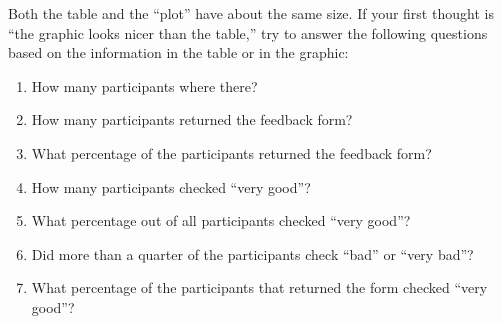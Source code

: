\bigskip
\par
{}
\bigskip

Both the table and the ``plot'' have about the same size. If your first
thought is ``the graphic looks nicer than the table,'' try to answer
the following questions based on the information in the table or in
the graphic:
\begin{enumerate}
\item
  How many participants where there?
\item
  How many participants returned the feedback form?
\item
  What percentage of the participants returned the feedback form?
\item
  How many participants checked ``very good''?
\item
  What percentage out of all participants checked ``very good''?
\item
  Did more than a quarter of the participants check ``bad'' or ``very bad''?
\item
  What percentage of the participants that returned the form checked ``very good''?
\end{enumerate}

